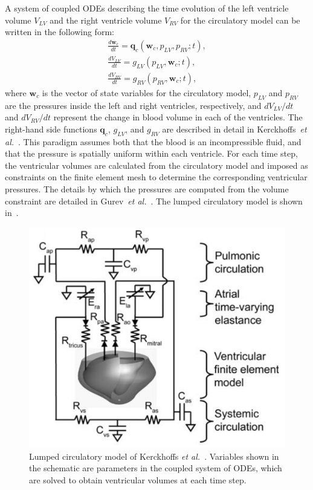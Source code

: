 A system of coupled ODEs describing the time evolution of the left ventricle volume $V_{LV}$ and the right ventricle volume $V_{RV}$ for the circulatory model can be written in the following form:
\begin{align}
\frac{d\bm{w}_{c}}{dt} = \bm{q}_c(\bm{w}_c, p_{LV}, p_{RV}; t), \\
\frac{dV_{LV}}{dt} = g_{LV}(p_{LV}, \bm{w}_c; t), \\
\frac{dV_{RV}}{dt} = g_{RV}(p_{RV}, \bm{w}_c; t),
\end{align}
where $\bm{w}_c$ is the vector of state variables for the circulatory model, $p_{LV}$ and $p_{RV}$ are the pressures inside the left and right ventricles, respectively, and ${dV_{LV}}/{dt}$ and ${dV_{RV}}/{dt}$ represent the change in blood volume in each of the ventricles. The right-hand side functions $\bm{q}_c$, $g_{LV}$, and $g_{RV}$ are described in detail in Kerckhoffs~\textit{et al.}~\cite{kerckhoffs_2006}. This paradigm assumes both that the blood is an incompressible fluid, and that the pressure is spatially uniform within each ventricle. For each time step, the ventricular volumes are calculated from the circulatory model and imposed as constraints on the finite element mesh to determine the corresponding ventricular pressures. The details by which the pressures are computed from the volume constraint are detailed in Gurev~\textit{et al.}~\cite{gurev_2015}. The lumped circulatory model is shown in~.
\begin{figure}[ht]
\centering
		\includegraphics[scale=0.3]{media/bcs.png}
\caption{Lumped circulatory model of Kerckhoffs \textit{et al.}~\cite{kerckhoffs_2006}. Variables shown in the schematic are parameters in the coupled system of ODEs, which are solved to obtain ventricular volumes at each time step.}
\label{fig:bcs}
\end{figure}

